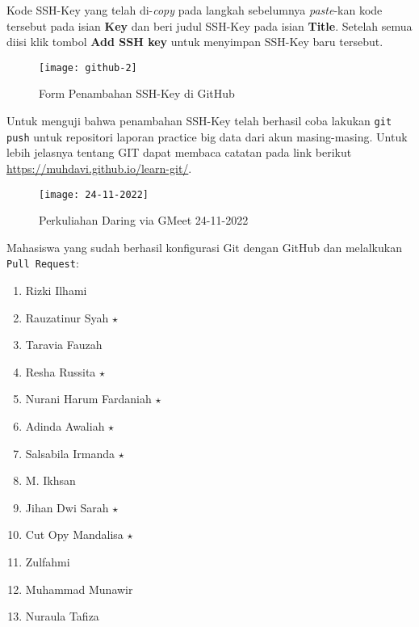 \documentclass[a4paper]{tufte-handout}
\begin{document}
\begin{enumerate}
Kode SSH-Key yang telah di-\textit{copy} pada langkah sebelumnya \textit{paste}-kan kode tersebut pada isian \textbf{Key} dan beri judul SSH-Key pada isian \textbf{Title}. Setelah semua diisi klik tombol \textbf{Add SSH key} untuk menyimpan SSH-Key baru tersebut.

\begin{figure}[!ht]
\texttt{[image: github-2]}
\caption{Form Penambahan SSH-Key di GitHub}
\label{gam:form-ssh}
\end{figure}

Untuk menguji bahwa penambahan SSH-Key telah berhasil coba lakukan {\tt git push} untuk repositori laporan practice big data dari akun masing-masing. Untuk lebih jelasnya tentang GIT dapat membaca catatan pada link berikut \url{https://muhdavi.github.io/learn-git/}.
\end{enumerate}

\begin{figure}[!ht]
\texttt{[image: 24-11-2022]}
\caption{Perkuliahan Daring via GMeet 24-11-2022}
\label{gam:form-ssh}
\end{figure}

\clearpage
{}


Mahasiswa yang sudah berhasil konfigurasi Git dengan GitHub dan melalkukan {\tt Pull Request}:
\begin{multicols}{2}
\begin{enumerate}
\item Rizki Ilhami
\item Rauzatinur Syah $\star$
\item Taravia Fauzah
\item Resha Russita $\star$
\item Nurani Harum Fardaniah $\star$
\item Adinda Awaliah $\star$
\item Salsabila Irmanda $\star$
\item M. Ikhsan
\item Jihan Dwi Sarah $\star$
\item Cut Opy Mandalisa $\star$
\item Zulfahmi
\item Muhammad Munawir
\item Nuraula Tafiza
\end{enumerate}
\end{multicols}
\end{document}
